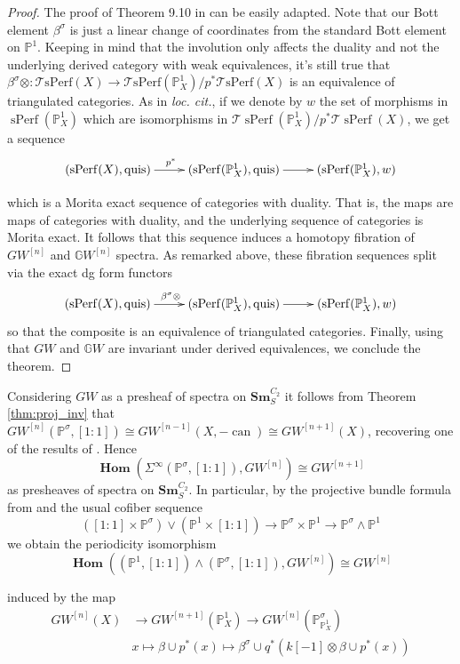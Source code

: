 \documentclass[edeposit,fullpage]{uiucthesis2009}
\newcommand{\mbb}{\mathbb}
\newcommand{\mc}{\mathcal}
\newcommand{\Sm}[1]{\mathbf{Sm}_{#1}}
\DeclareMathOperator{\can}{can}
\DeclareMathOperator{\iHom}{\mathbf{Hom}}
\DeclareMathOperator{\sPerf}{sPerf}
\theoremstyle{plain}
\numberwithin{lemma}{section}
\theoremstyle{definition}
\begin{document}
\begin{proof}
The proof of Theorem 9.10 in \cite{Schder} can be easily adapted. Note
that our Bott element $\beta^\sigma$ is just a linear change of
coordinates from the standard Bott element on $\mbb P^1$. Keeping in
mind that the involution only affects the duality and not the
underlying derived category with weak equivalences, it's still true
that $\beta^\sigma \otimes : \mc T\mathrm{sPerf}(X) \rightarrow \mc
T\mathrm{sPerf}(\mbb P^1_X)/p^*\mc T\mathrm{sPerf}(X)$ is an
equivalence of triangulated categories. As in
\textit{loc. cit.}, if we denote by $w$ the set of morphisms in
$\sPerf(\mbb P^1_X)$ which are isomorphisms in $\mc T\sPerf(\mbb
P^1_X)/p^*\mc T\sPerf(X)$, we get a sequence
\[
\xymatrix{(\sPerf(X),\mathrm{quis}) \ar[r]^{p^*} & (\sPerf(\mbb
  P^1_X),\mathrm{quis}) \ar[r] & (\sPerf(\mbb P^1_X),w)}
\]

which is a Morita exact sequence of categories with duality. That is,
the maps are maps of categories with duality, and the underlying
sequence of categories is Morita exact. It follows that this sequence
induces a homotopy fibration of $GW^{[n]}$ and $\mbb GW^{[n]}$
spectra. As remarked above, these fibration sequences split via the
exact dg form functors
\[
\xymatrix{(\sPerf(X),\mathrm{quis}) \ar[r]^{\beta^\sigma \otimes} & (\sPerf(\mbb
  P^1_X),\mathrm{quis}) \ar[r] & (\sPerf(\mbb P^1_X),w)}
\]
so that the composite is an equivalence of triangulated categories.
Finally, using that $GW$ and $\mbb GW$ are invariant under derived
equivalences, we conclude the theorem.
\end{proof}

Considering $GW$ as a presheaf of spectra on $\Sm{S}^{C_2}$ it follows from
Theorem \ref{thm:proj_inv} that $GW^{[n]}(\mbb P^\sigma,[1:1]) \cong
GW^{[n-1]}(X,-\can) \cong GW^{[n+1]}(X)$, recovering one of the results of
  \cite{Xie2018ATM}. Hence
\[
\iHom(\Sigma^\infty (\mbb P^\sigma,[1:1]),GW^{[n]}) \cong
GW^{[n+1]}
\]
as presheaves of spectra on $\Sm{S}^{C_2}$. In particular, by the
projective bundle formula from \cite{Schder} and the usual cofiber
sequence 
\[
([1:1] \times \mbb P^\sigma) \vee (\mbb P^1 \times [1:1]) \rightarrow
\mbb P^\sigma \times \mbb P^1 \rightarrow \mbb P^\sigma \wedge \mbb P^1
\]
we obtain the periodicity isomorphism  
\[
\iHom((\mbb P^1,[1:1]) \wedge (\mbb P^\sigma,[1:1]),GW^{[n]}) \cong
GW^{[n]}
\]

induced by the map 
\begin{align*}
GW^{[n]}(X) &\rightarrow GW^{[n+1]}(\mbb P^1_X) \rightarrow
              GW^{[n]}(\mbb P^\sigma_{\mbb P^1_X})\\
& x \mapsto \beta \cup p^*(x) \mapsto \beta^\sigma \cup q^*(k[-1]
  \otimes \beta \cup p^*(x))
\end{align*}
\end{document}
